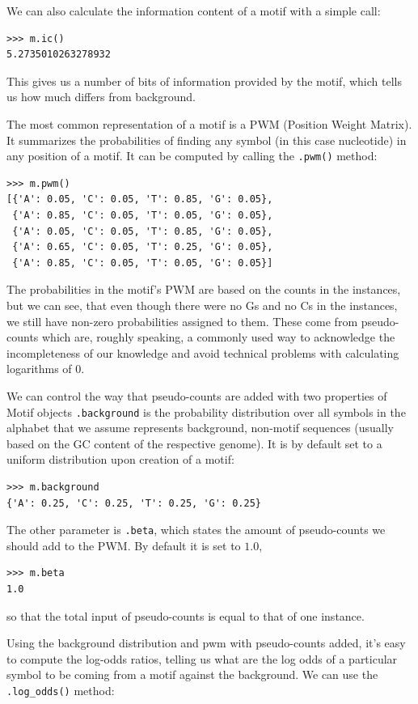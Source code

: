 \documentclass{report}
\begin{document}
We can also calculate the information content of a motif with a simple call:
\begin{verbatim}
>>> m.ic()
5.2735010263278932
\end{verbatim}
This gives us a number of bits of information provided by the motif,
which tells us how much differs from background.

The most common representation of a motif is a PWM (Position Weight
Matrix). It summarizes the probabilities of finding any symbol (in
this case nucleotide) in any position of a motif. It can be computed by calling the \verb|.pwm()| method:
\begin{verbatim}
>>> m.pwm()
[{'A': 0.05, 'C': 0.05, 'T': 0.85, 'G': 0.05}, 
 {'A': 0.85, 'C': 0.05, 'T': 0.05, 'G': 0.05}, 
 {'A': 0.05, 'C': 0.05, 'T': 0.85, 'G': 0.05}, 
 {'A': 0.65, 'C': 0.05, 'T': 0.25, 'G': 0.05}, 
 {'A': 0.85, 'C': 0.05, 'T': 0.05, 'G': 0.05}]
\end{verbatim}
The probabilities in the motif's PWM are based on the counts in the
instances, but we can see, that even though there were no Gs and no Cs
in the instances, we still have non-zero probabilities assigned to
them. These come from pseudo-counts which are, roughly speaking, a
commonly used way to acknowledge the incompleteness of our knowledge
and avoid technical problems with calculating logarithms of $0$.

We can control the way that pseudo-counts are added with two
properties of Motif objects \verb|.background| is the probability
distribution over all symbols in the alphabet that we assume represents background, non-motif sequences (usually based on the GC content of the respective
genome). It is by default set to a uniform distribution upon creation of a motif:
\begin{verbatim}
>>> m.background  
{'A': 0.25, 'C': 0.25, 'T': 0.25, 'G': 0.25}
\end{verbatim}
The other parameter is \verb|.beta|, which states the amount of
pseudo-counts we should add to the PWM. By default it is set to $1.0$,
\begin{verbatim}
>>> m.beta
1.0
\end{verbatim}
so that the total input of pseudo-counts is equal to that of one instance. 

Using the background distribution and pwm with pseudo-counts added,
it's easy to compute the log-odds ratios, telling us what are the log
odds of a particular symbol to be coming from a motif against the
background. We can use the \verb|.log_odds()| method:
\end{document}
